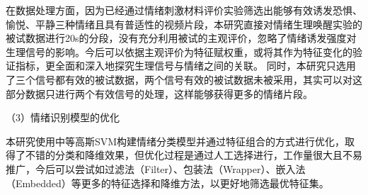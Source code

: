 在数据处理方面，因为已经通过情绪刺激材料评价实验筛选出能够有效诱发恐惧、愉悦、平静三种情绪且具有普适性的视频片段，本研究直接对情绪生理唤醒实验的被试数据进行20s的分段，没有充分利用被试的主观评价，忽略了情绪诱发强度对生理信号的影响。今后可以依据主观评价为特征赋权重，或将其作为特征变化的验证指标，更全面和深入地探究生理信号与情绪之间的关联。
同时，本研究只选用了三个信号都有效的被试数据，两个信号有效的被试数据未被采用，其实可以对这部分数据只进行两个有效信号的处理，这样能够获得更多的情绪片段。

（3）情绪识别模型的优化

本研究使用中等高斯SVM构建情绪分类模型并通过特征组合的方式进行优化，取得了不错的分类和降维效果，但优化过程是通过人工选择进行，工作量很大且不易推广，今后可以尝试如过滤法（Filter）、包装法（Wrapper）、嵌入法（Embedded）等更多的特征选择和降维方法，以更好地筛选最优特征集。

